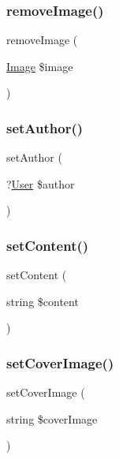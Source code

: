 \subsubsection{\texorpdfstring{removeImage()}{removeImage()}}
{\footnotesize\ttfamily remove\+Image (\begin{DoxyParamCaption}\item[{\mbox{\hyperlink{class_app_1_1_entity_1_1_image}{Image}}}]{\$image }\end{DoxyParamCaption})}

\mbox{\label{class_app_1_1_entity_1_1_ad_adc1408587dab3390f96d6d8bf16324e5}} 
\subsubsection{\texorpdfstring{setAuthor()}{setAuthor()}}
{\footnotesize\ttfamily set\+Author (\begin{DoxyParamCaption}\item[{?\mbox{\hyperlink{class_app_1_1_entity_1_1_user}{User}}}]{\$author }\end{DoxyParamCaption})}

\mbox{\label{class_app_1_1_entity_1_1_ad_a89b90bd7e4de551ffdaa3796cda3e9be}} 
\subsubsection{\texorpdfstring{setContent()}{setContent()}}
{\footnotesize\ttfamily set\+Content (\begin{DoxyParamCaption}\item[{string}]{\$content }\end{DoxyParamCaption})}

\mbox{\label{class_app_1_1_entity_1_1_ad_ae4d5ad27ff0c6741b3d362abe13275bc}} 
\subsubsection{\texorpdfstring{setCoverImage()}{setCoverImage()}}
{\footnotesize\ttfamily set\+Cover\+Image (\begin{DoxyParamCaption}\item[{string}]{\$cover\+Image }\end{DoxyParamCaption})}

